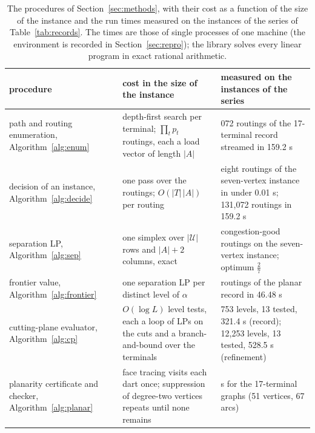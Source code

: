 \begin{table}[t]
\centering\footnotesize
\begin{tabular}{@{}>{\raggedright\arraybackslash}p{3.3cm}>{\raggedright\arraybackslash}p{4.3cm}>{\raggedright\arraybackslash}p{4.9cm}@{}}
\toprule
procedure & cost in the size of the instance & measured on the instances of the series\\
\midrule
path and routing enumeration, Algorithm~\ref{alg:enum} & depth-first search per terminal; $\prod_t p_t$ routings, each a load vector of length $|A|$ & 131{,}072 routings of the 17-terminal record streamed in 159.2 s\\[2pt]
decision of an instance, Algorithm~\ref{alg:decide} & one pass over the routings; $O(|T|\,|A|)$ per routing & eight routings of the seven-vertex instance in under 0.01 s; 131{,}072 routings in 159.2 s\\[2pt]
separation LP, Algorithm~\ref{alg:sep} & one simplex over $|\mathcal U|$ rows and $|A|+2$ columns, exact & 4 congestion-good routings on the seven-vertex instance; optimum $\tfrac27$\\[2pt]
frontier value, Algorithm~\ref{alg:frontier} & one separation LP per distinct level of $\alpha$ & 64 routings of the planar record in 46.48 s\\[2pt]
cutting-plane evaluator, Algorithm~\ref{alg:cp} & $O(\log L)$ level tests, each a loop of LPs on the cuts and a branch-and-bound over the terminals & 7{,}753 levels, 13 tested, 321.4 s (record); 12{,}253 levels, 13 tested, 528.5 s (refinement)\\[2pt]
planarity certificate and checker, Algorithm~\ref{alg:planar} & face tracing visits each dart once; suppression of degree-two vertices repeats until none remains & 0.13 s for the 17-terminal graphs (51 vertices, 67 arcs)\\[2pt]
\bottomrule
\end{tabular}
\caption{The procedures of Section~\ref{sec:methods}, with their cost as a function of the size of the instance and the run times measured on the instances of the series of Table~\ref{tab:records}. The times are those of single processes of one machine (the environment is recorded in Section~\ref{sec:repro}); the library solves every linear program in exact rational arithmetic.}
\label{tab:procedures}
\end{table}
